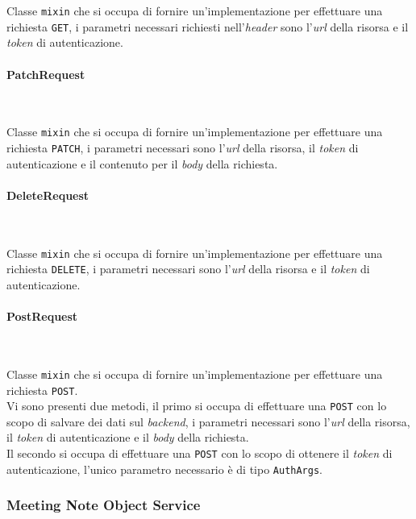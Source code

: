 \noindent Classe \lstinline{mixin} che si occupa di fornire un'implementazione per effettuare una richiesta \lstinline{GET}, i parametri necessari richiesti nell'\emph{header} sono l'\emph{url} della risorsa e il \emph{token} di autenticazione.

\paragraph*{PatchRequest} ~ \\
\label{par:patch-request}

\noindent Classe \lstinline{mixin} che si occupa di fornire un'implementazione per effettuare una richiesta \lstinline{PATCH}, i parametri necessari sono l'\emph{url} della risorsa, il \emph{token} di autenticazione e il contenuto per il \emph{body} della richiesta.

\paragraph*{DeleteRequest} ~ \\
\label{par:delete-request}

\noindent Classe \lstinline{mixin} che si occupa di fornire un'implementazione per effettuare una richiesta \lstinline{DELETE}, i parametri necessari sono l'\emph{url} della risorsa e il \emph{token} di autenticazione.

\paragraph*{PostRequest} ~ \\
\label{par:post-request}

\noindent Classe \lstinline{mixin} che si occupa di fornire un'implementazione per effettuare una richiesta \lstinline{POST}. \\
Vi sono presenti due metodi, il primo si occupa di effettuare una \lstinline{POST} con lo scopo di salvare dei dati sul \emph{backend}, i parametri necessari sono l'\emph{url} della risorsa, il \emph{token} di autenticazione e il \emph{body} della richiesta. \\
Il secondo si occupa di effettuare una \lstinline{POST} con lo scopo di ottenere il \emph{token} di autenticazione, l'unico parametro necessario è di tipo \lstinline{AuthArgs}.

\subsubsection*{Meeting Note Object Service}
\label{subsubsec:meeting-note-object-service}

